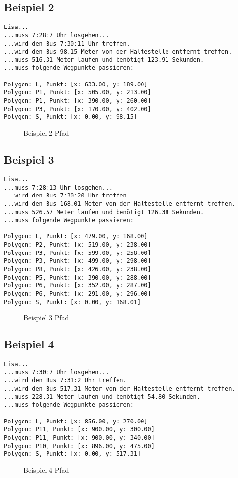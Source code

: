 \documentclass[a4paper,10pt,ngerman]{scrartcl}
\begin{document}
\subsection{Beispiel 2}
\begin{verbatim}
Lisa...
...muss 7:28:7 Uhr losgehen...
...wird den Bus 7:30:11 Uhr treffen.
...wird den Bus 98.15 Meter von der Haltestelle entfernt treffen.
...muss 516.31 Meter laufen und benötigt 123.91 Sekunden.
...muss folgende Wegpunkte passieren:

Polygon: L, Punkt: [x: 633.00, y: 189.00]
Polygon: P1, Punkt: [x: 505.00, y: 213.00]
Polygon: P1, Punkt: [x: 390.00, y: 260.00]
Polygon: P3, Punkt: [x: 170.00, y: 402.00]
Polygon: S, Punkt: [x: 0.00, y: 98.15]
\end{verbatim}
\begin{figure}[H]
  \def\svgwidth{\columnwidth} 
  
  \caption{Beispiel 2 Pfad}
\end{figure}
\subsection{Beispiel 3}
\begin{verbatim}
Lisa...
...muss 7:28:13 Uhr losgehen...
...wird den Bus 7:30:20 Uhr treffen.
...wird den Bus 168.01 Meter von der Haltestelle entfernt treffen.
...muss 526.57 Meter laufen und benötigt 126.38 Sekunden.
...muss folgende Wegpunkte passieren:

Polygon: L, Punkt: [x: 479.00, y: 168.00]
Polygon: P2, Punkt: [x: 519.00, y: 238.00]
Polygon: P3, Punkt: [x: 599.00, y: 258.00]
Polygon: P3, Punkt: [x: 499.00, y: 298.00]
Polygon: P8, Punkt: [x: 426.00, y: 238.00]
Polygon: P5, Punkt: [x: 390.00, y: 288.00]
Polygon: P6, Punkt: [x: 352.00, y: 287.00]
Polygon: P6, Punkt: [x: 291.00, y: 296.00]
Polygon: S, Punkt: [x: 0.00, y: 168.01]
\end{verbatim}
\begin{figure}[H]
  \def\svgwidth{\columnwidth} 
  
  \caption{Beispiel 3 Pfad}
\end{figure}
\subsection{Beispiel 4}
\begin{verbatim}
Lisa...
...muss 7:30:7 Uhr losgehen...
...wird den Bus 7:31:2 Uhr treffen.
...wird den Bus 517.31 Meter von der Haltestelle entfernt treffen.
...muss 228.31 Meter laufen und benötigt 54.80 Sekunden.
...muss folgende Wegpunkte passieren:

Polygon: L, Punkt: [x: 856.00, y: 270.00]
Polygon: P11, Punkt: [x: 900.00, y: 300.00]
Polygon: P11, Punkt: [x: 900.00, y: 340.00]
Polygon: P10, Punkt: [x: 896.00, y: 475.00]
Polygon: S, Punkt: [x: 0.00, y: 517.31]
\end{verbatim}
\begin{figure}[H]
\def\svgwidth{\columnwidth} 

\caption{Beispiel 4 Pfad}
\end{figure}
\end{document}

